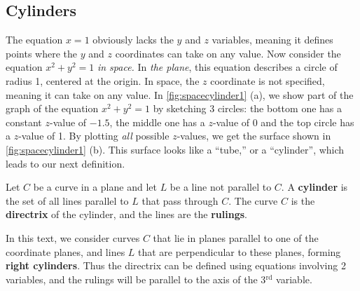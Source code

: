 \subsection{Cylinders}

The equation $x=1$ obviously lacks the $y$ and $z$ variables, meaning it defines points where the $y$ and $z$ coordinates can take on any value. Now consider the equation $x^2+y^2=1$ \emph{in space.} In \emph{the plane}, this equation describes a circle of radius 1, centered at the origin. In space, the $z$ coordinate is not specified, meaning it can take on any value. In \autoref{fig:spacecylinder1} (a), we show part of the graph of the equation $x^2+y^2=1$ by sketching 3 circles: the bottom one has a constant $z$-value of $-1.5$, the middle one has a $z$-value of 0 and the top circle has a $z$-value of 1. By plotting \emph{all} possible $z$-values, we get the  surface shown in \autoref{fig:spacecylinder1} (b). This surface looks like a ``tube,'' or a ``cylinder'', which leads to our next definition.


\begin{definition}[Cylinder]\label{def:cylinder}%
Let $C$ be a curve in a plane and let $L$ be a line not parallel to $C$. A \textbf{cylinder} is the set of all lines parallel to $L$ that pass through $C$. The curve $C$ is the \textbf{directrix} of the cylinder, and the lines are the \textbf{rulings}.
\end{definition}

In this text, we consider curves $C$ that lie in planes parallel to one of the coordinate planes, and lines $L$ that are perpendicular to these planes, forming \textbf{right cylinders}. Thus the directrix can be defined using equations involving 2 variables, and the rulings will be parallel to the axis of the 3$^\text{rd}$ variable.

